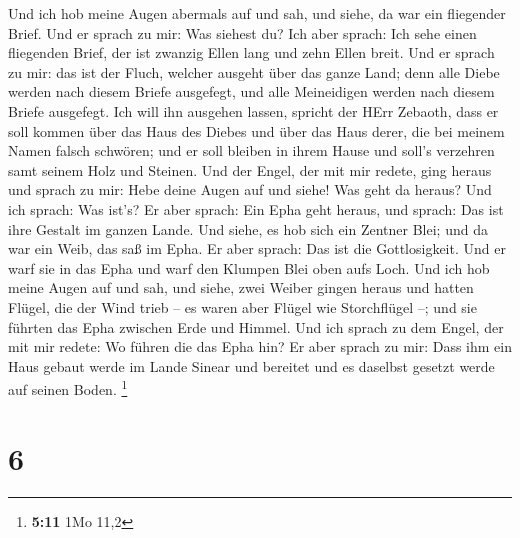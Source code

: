  Und ich hob meine Augen abermals auf und sah, und siehe, da
war ein fliegender Brief.  Und er sprach zu mir: Was siehest
du? Ich aber sprach: Ich sehe einen fliegenden Brief, der ist zwanzig
Ellen lang und zehn Ellen breit.  Und er sprach zu mir: das
ist der Fluch, welcher ausgeht über das ganze Land; denn alle Diebe
werden nach diesem Briefe ausgefegt, und alle Meineidigen werden nach
diesem Briefe ausgefegt.  Ich will ihn ausgehen lassen,
spricht der HErr Zebaoth, dass er soll kommen über das Haus des Diebes
und über das Haus derer, die bei meinem Namen falsch schwören; und er
soll bleiben in ihrem Hause und soll's verzehren samt seinem Holz und
Steinen.  Und der Engel, der mit mir redete, ging heraus und
sprach zu mir: Hebe deine Augen auf und siehe! Was geht da heraus?
 Und ich sprach: Was ist's? Er aber sprach: Ein Epha geht
heraus, und sprach: Das ist ihre Gestalt im ganzen Lande. 
Und siehe, es hob sich ein Zentner Blei; und da war ein Weib, das saß im
Epha.  Er aber sprach: Das ist die Gottlosigkeit. Und er
warf sie in das Epha und warf den Klumpen Blei oben aufs Loch.
 Und ich hob meine Augen auf und sah, und siehe, zwei Weiber
gingen heraus und hatten Flügel, die der Wind trieb -- es waren aber
Flügel wie Storchflügel --; und sie führten das Epha zwischen Erde und
Himmel.  Und ich sprach zu dem Engel, der mit mir redete:
Wo führen die das Epha hin?  Er aber sprach zu mir: Dass
ihm ein Haus gebaut werde im Lande Sinear und bereitet und es daselbst
gesetzt werde auf seinen Boden. \footnote{\textbf{5:11} 1Mo 11,2}

\hypertarget{section-5}{%
\section{6}\label{section-5}}

